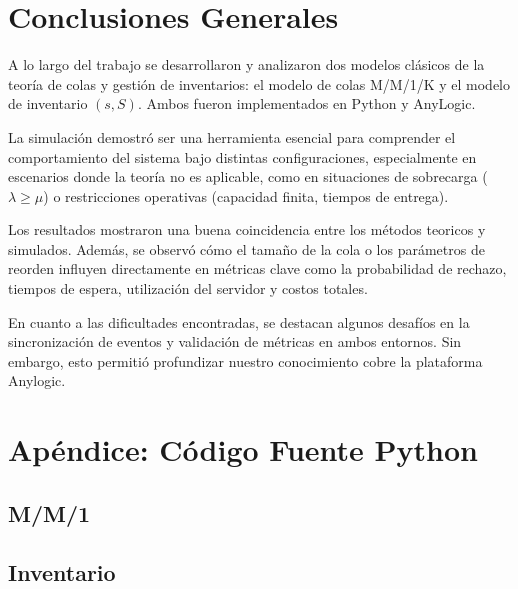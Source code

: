 \documentclass[12pt]{article}
\begin{document}
\section{Conclusiones Generales}

A lo largo del trabajo se desarrollaron y analizaron dos modelos clásicos de la teoría de colas y gestión de inventarios: el modelo de colas M/M/1/K y el modelo de inventario $(s, S)$. Ambos fueron implementados en Python y AnyLogic.

La simulación demostró ser una herramienta esencial para comprender el comportamiento del sistema bajo distintas configuraciones, especialmente en escenarios donde la teoría no es aplicable, como en situaciones de sobrecarga (\( \lambda \geq \mu \)) o restricciones operativas (capacidad finita, tiempos de entrega).

Los resultados mostraron una buena coincidencia entre los métodos teoricos y simulados. Además, se observó cómo el tamaño de la cola o los parámetros de reorden influyen directamente en métricas clave como la probabilidad de rechazo, tiempos de espera, utilización del servidor y costos totales.

En cuanto a las dificultades encontradas, se destacan algunos desafíos en la sincronización de eventos y validación de métricas en ambos entornos. Sin embargo, esto permitió profundizar nuestro conocimiento cobre la plataforma Anylogic.



\appendix
\section{Apéndice: Código Fuente Python}
\subsection*{M/M/1}


\subsection*{Inventario}

\end{document}
